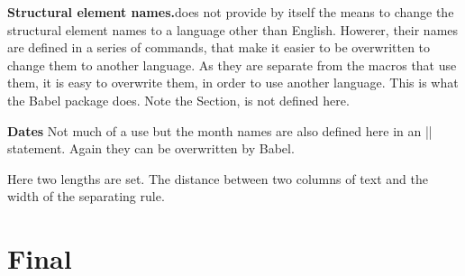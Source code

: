 \begin{multicols}{2}
\textbf{Structural element names.}\quad \latex does not provide by itself the means to change the structural element names to a language other than English. Howerer, their names are defined  in a series of commands, that make it easier to be overwritten to change them to another language. As they are separate from the macros that use them, it is easy to overwrite them, in order to use another language. This is what the Babel package does. Note the Section, is not defined here.
\end{multicols}

\begin{teX}
\newcommand\contentsname{Contents}
\newcommand\listfigurename{List of Figures}
\newcommand\listtablename{List of Tables}
\newcommand\bibname{Bibliography}
\newcommand\indexname{Index}
\newcommand\figurename{Figure}
\newcommand\tablename{Table}
\newcommand\partname{Part}
\newcommand\chaptername{Chapter}
\newcommand\appendixname{Appendix}
\end{teX}

\textbf{Dates} Not much of a use but the month names are also defined here in an |\ifcase| statement. Again they can be overwritten by Babel.


\begin{teX}
\def\today{\ifcase\month\or
  January\or February\or March\or April\or May\or June\or
  July\or August\or September\or October\or November\or December\fi
  \space\number\day, \number\year}
\end{teX}

\quad Here two lengths are set. The distance between two columns of text and the width of the separating rule.

\begin{teX}
\setlength{}
\setlength{}
\end{teX}


\section{Final}


